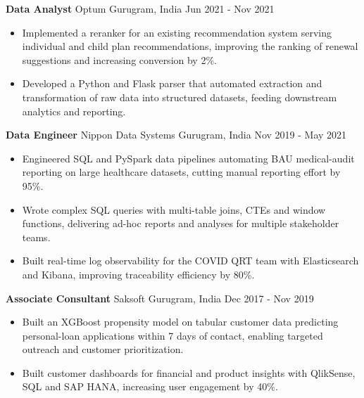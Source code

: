 \documentclass[10pt,a4paper]{article}
\newcommand{\role}[4]{\textbf{#1} \textbar{} #2 \hfill #3 \textbar{} #4\par}
\begin{document}
\vspace{3pt}
\role{Data Analyst}{Optum}{Gurugram, India}{Jun 2021 - Nov 2021}
\begin{itemize}
  \item Implemented a reranker for an existing recommendation system serving individual and child plan recommendations, improving the ranking of renewal suggestions and increasing conversion by 2\%.
  \item Developed a Python and Flask parser that automated extraction and transformation of raw data into structured datasets, feeding downstream analytics and reporting.
\end{itemize}
\vspace{3pt}
\role{Data Engineer}{Nippon Data Systems}{Gurugram, India}{Nov 2019 - May 2021}
\begin{itemize}
  \item Engineered SQL and PySpark data pipelines automating BAU medical-audit reporting on large healthcare datasets, cutting manual reporting effort by 95\%.
  \item Wrote complex SQL queries with multi-table joins, CTEs and window functions, delivering ad-hoc reports and analyses for multiple stakeholder teams.
  \item Built real-time log observability for the COVID QRT team with Elasticsearch and Kibana, improving traceability efficiency by 80\%.
\end{itemize}
\vspace{3pt}
\role{Associate Consultant}{Saksoft}{Gurugram, India}{Dec 2017 - Nov 2019}
\begin{itemize}
  \item Built an XGBoost propensity model on tabular customer data predicting personal-loan applications within 7 days of contact, enabling targeted outreach and customer prioritization.
  \item Built customer dashboards for financial and product insights with QlikSense, SQL and SAP HANA, increasing user engagement by 40\%.
\end{itemize}
\end{document}
